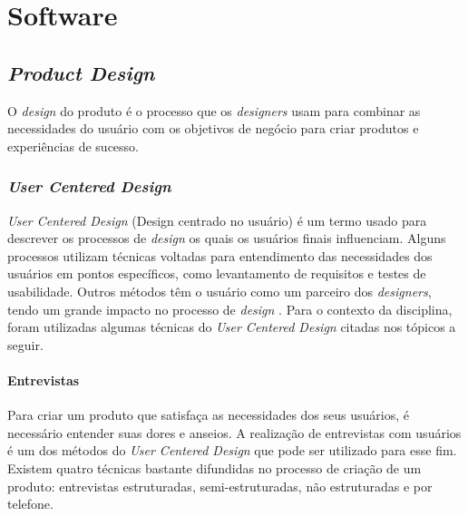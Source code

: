 \chapter{Software}

\section{\textit{Product Design}}

\par O \textit{design} do produto é o processo que os \textit{designers} usam para combinar as necessidades do usuário com os objetivos de negócio para criar produtos e experiências de sucesso. 

\subsection{\textit{User Centered Design}}

\par \textit{User Centered Design} (Design centrado no usuário) é um termo usado para descrever os processos de \textit{design} os quais os usuários finais influenciam. Alguns processos utilizam técnicas voltadas para entendimento das necessidades dos usuários em pontos específicos, como levantamento de requisitos e testes de usabilidade. Outros métodos têm o usuário como um parceiro dos \textit{designers}, tendo um grande impacto no processo de \textit{design} \cite{abras2004user}.
Para o contexto da disciplina, foram utilizadas algumas técnicas do \textit{User Centered Design} citadas nos tópicos a seguir.

\subsubsection{Entrevistas}

\par Para criar um produto que satisfaça as necessidades dos seus usuários, é necessário entender suas dores e anseios. A realização de entrevistas com usuários é um dos métodos do \textit{User Centered Design} que pode ser utilizado para esse fim.
Existem quatro técnicas bastante difundidas no processo de criação de um produto: entrevistas estruturadas, semi-estruturadas, não estruturadas e por telefone. \cite{wilson2013interview}

